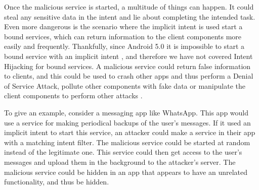     Once the malicious service is started, a multitude of things can happen. It could steal any sensitive data in the intent and lie about completing the intended task. Even more dangerous is the scenario where the implicit intent is used start a bound services, which can return information to the client components more easily and frequently. Thankfully, since Android 5.0 it is impossible to start a bound service with an implicit intent \cite{bound_services}, and therefore we have not covered Intent Hijacking for bound services. A malicious service could return false information to clients, and this could be used to crash other apps and thus perform a Denial of Service Attack, pollute other components with fake data or manipulate the client components to perform other attacks \cite{2010_icc_paper}.
    
    To give an example, consider a messaging app like WhatsApp. This app would use a service for making periodical backups of the user’s messages. If it used an implicit intent to start this service, an attacker could make a service in their app with a matching intent filter. The malicious service could be started at random instead of the legitimate one. This service could then get access to the user’s messages and upload them in the background to the attacker’s server. The malicious service could be hidden in an app that appears to have an unrelated functionality, and thus be hidden.
    